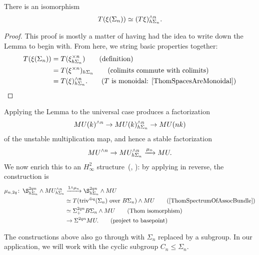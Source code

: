 \begin{lemma}\label{ThomSpectrumOfAssocBundle}
There is an isomorphism \[T(\xi(\Sigma_n)) \simeq (T\xi)^{\wedge n}_{h\Sigma_n}.\]
\end{lemma}
\begin{proof}
This proof is mostly a matter of having had the idea to write down the Lemma to begin with.  From here, we string basic properties together:
\begin{align*}
T(\xi(\Sigma_n)) & = T(\xi^{\times n}_{h\Sigma_n}) \tag{definition} \\
& = T(\xi^{\times n})_{h\Sigma_n} \tag{colimits commute with colimits} \\
& = T(\xi)^{\sm n}_{h\Sigma_n}. \tag{\(T\) is monoidal: \Cref{ThomSpacesAreMonoidal}}
\end{align*}
\end{proof}

Applying the Lemma to the universal case produces a factorization \[MU(k)^{\wedge n} \to MU(k)^{\wedge n}_{h\Sigma_n} \to MU(nk)\] of the unstable multiplication map, and hence a stable factorization \[MU^{\wedge n} \to MU^{\wedge n}_{h\Sigma_n} \xrightarrow{\mu_n} MU.\]  We now enrich this to an \(H_\infty^2\) structure~(\cite[Section 3.2]{JohnsonNoel}, \cite[Corollary VIII.5.3]{BMMS}): by applying  in reverse, the construction is
\begin{align*}
\mu_{n,2q}\co \S^{2qn}_{h\Sigma_n} \sm MU^{\sm n}_{h\Sigma_n} & \xrightarrow{1 \sm \mu_n} \S^{2qn}_{h\Sigma_n} \sm MU \\
& \simeq T(\text{\(\mathrm{triv}^{\oplus q}(\Sigma_n)\) over \(B\Sigma_n\)}) \sm MU \tag{\Cref{ThomSpectrumOfAssocBundle}} \\
& \simeq \Sigma^{2qn}_+ B\Sigma_n \sm MU \tag{Thom isomorphism} \\
& \to \Sigma^{2qn} MU. \tag{project to basepoint}
\end{align*}

\begin{remark}\label{PowerOpnsForSubgroupsToo}
The constructions above also go through with \(\Sigma_n\) replaced by a subgroup.  In our application, we will work with the cyclic subgroup \(C_n \le \Sigma_n\).
\end{remark}

